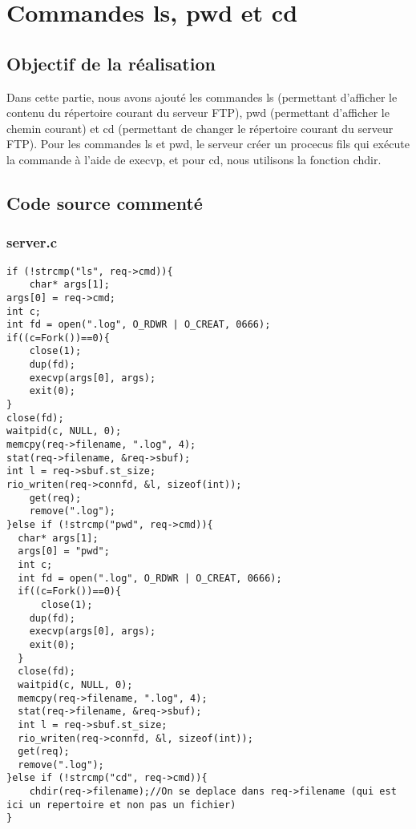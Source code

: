 \documentclass{report}
\begin{document}
    \chapter{Commandes ls, pwd et cd}
      \section{Objectif de la r\'ealisation}
	Dans cette partie, nous avons ajout\'e les commandes ls (permettant d'afficher le contenu du r\'epertoire courant du serveur FTP),
  pwd (permettant d'afficher le chemin courant) et cd (permettant de changer le r\'epertoire courant du serveur FTP). Pour les commandes ls et pwd,
  le serveur cr\'eer un procecus fils qui ex\'ecute la commande \`a l'aide de execvp, et pour cd, nous utilisons la fonction chdir.\\
      \section{Code source comment\'e}
      \subsection{server.c}
\begin{lstlisting}
if (!strcmp("ls", req->cmd)){
    char* args[1];
args[0] = req->cmd;
int c;
int fd = open(".log", O_RDWR | O_CREAT, 0666);
if((c=Fork())==0){
    close(1);
    dup(fd);
    execvp(args[0], args);
    exit(0);
}
close(fd);
waitpid(c, NULL, 0);
memcpy(req->filename, ".log", 4);
stat(req->filename, &req->sbuf);
int l = req->sbuf.st_size;
rio_writen(req->connfd, &l, sizeof(int));
    get(req);
    remove(".log");
}else if (!strcmp("pwd", req->cmd)){
  char* args[1];
  args[0] = "pwd";
  int c;
  int fd = open(".log", O_RDWR | O_CREAT, 0666);
  if((c=Fork())==0){
      close(1);
    dup(fd);
    execvp(args[0], args);
    exit(0);
  }
  close(fd);
  waitpid(c, NULL, 0);
  memcpy(req->filename, ".log", 4);
  stat(req->filename, &req->sbuf);
  int l = req->sbuf.st_size;
  rio_writen(req->connfd, &l, sizeof(int));
  get(req);
  remove(".log");
}else if (!strcmp("cd", req->cmd)){
    chdir(req->filename);//On se deplace dans req->filename (qui est ici un repertoire et non pas un fichier)
}
      \end{lstlisting}
\end{document}
